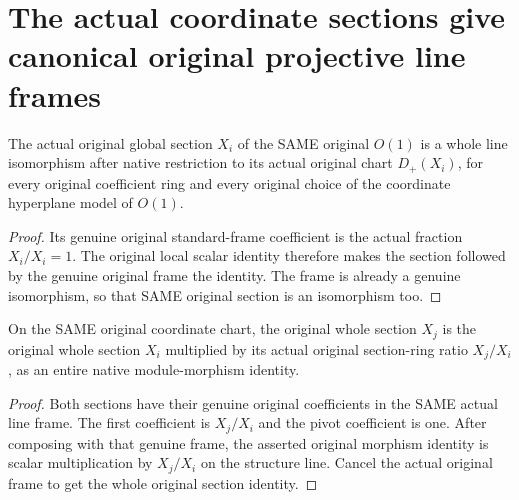 \section{The actual coordinate sections give canonical original projective line frames}

\begin{theorem}
\label{thm:fc-coordinate-section-own-chart-frame}
\leanok
{}
The actual original global section $X_i$ of the SAME original
$O(1)$ is a whole line isomorphism after native restriction to its
actual original chart $D_+(X_i)$, for every original coefficient
ring and every original choice of the coordinate hyperplane model
of $O(1)$.
\end{theorem}
\begin{proof}
Its genuine original standard-frame coefficient is the actual
fraction $X_i/X_i=1$. The original local scalar identity therefore
makes the section followed by the genuine original frame the
identity. The frame is already a genuine isomorphism, so that
SAME original section is an isomorphism too.
\end{proof}

\begin{theorem}
\label{thm:fc-coordinate-section-chart-ratio}
\leanok
{}
On the SAME original coordinate chart, the original whole section
$X_j$ is the original whole section $X_i$ multiplied by its actual
original section-ring ratio $X_j/X_i$, as an entire native
module-morphism identity.
\end{theorem}
\begin{proof}
Both sections have their genuine original coefficients in the SAME
actual line frame. The first coefficient is $X_j/X_i$ and the
pivot coefficient is one. After composing with that genuine frame,
the asserted original morphism identity is scalar multiplication
by $X_j/X_i$ on the structure line. Cancel the actual original
frame to get the whole original section identity.
\end{proof}
